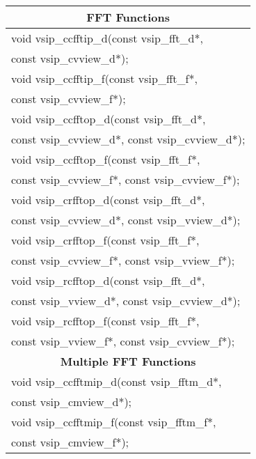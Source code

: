 \newline \hspace*{1.cm} {
\ttfamily
\begin{tabular}[H]{|l|}
\multicolumn{1}{c}{\rmfamily \bfseries FFT Functions}\\ \hline
void vsip\_ccfftip\_d(const vsip\_fft\_d*,\\*\hspace{.7cm}const vsip\_cvview\_d*);\\
void vsip\_ccfftip\_f(const vsip\_fft\_f*,\\*\hspace{.7cm} const vsip\_cvview\_f*);\\
void vsip\_ccfftop\_d(const vsip\_fft\_d*,\\*\hspace{.7cm} const vsip\_cvview\_d*, const vsip\_cvview\_d*);\\
void vsip\_ccfftop\_f(const vsip\_fft\_f*,\\*\hspace{.7cm} const vsip\_cvview\_f*, const vsip\_cvview\_f*);\\
void vsip\_crfftop\_d(const vsip\_fft\_d*,\\*\hspace{.7cm} const vsip\_cvview\_d*, const vsip\_vview\_d*);\\
void vsip\_crfftop\_f(const vsip\_fft\_f*,\\*\hspace{.7cm} const vsip\_cvview\_f*, const vsip\_vview\_f*);\\
void vsip\_rcfftop\_d(const vsip\_fft\_d*,\\*\hspace{.7cm} const vsip\_vview\_d*, const vsip\_cvview\_d*);\\
void vsip\_rcfftop\_f(const vsip\_fft\_f*,\\*\hspace{.7cm} const vsip\_vview\_f*, const vsip\_cvview\_f*);\\ \hline \multicolumn{1}{c}{\rmfamily \bfseries Multiple FFT Functions}\\\hline
void vsip\_ccfftmip\_d(const vsip\_fftm\_d*,\\*\hspace{.7cm} const vsip\_cmview\_d*);\\
void vsip\_ccfftmip\_f(const vsip\_fftm\_f*,\\*\hspace{.7cm} const vsip\_cmview\_f*);\\

\end{tabular}}
